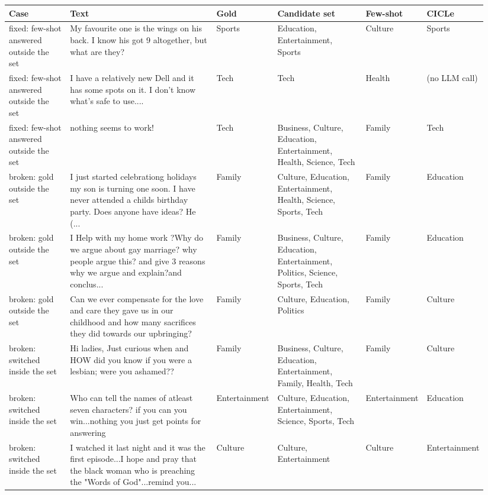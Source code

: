 \begin{tabular}{p{0.14\linewidth}p{0.36\linewidth}p{0.08\linewidth}p{0.2\linewidth}p{0.08\linewidth}p{0.08\linewidth}}
\toprule
Case & Text & Gold & Candidate set & Few-shot & CICLe \\
\midrule
fixed: few-shot answered outside the set & My favourite one is the wings on his back. I know his got 9 altogether, but what are they? & Sports & Education, Entertainment, Sports & Culture & Sports \\
fixed: few-shot answered outside the set & I have a relatively new Dell and it has some spots on it. I don't know what's safe to use.... & Tech & Tech & Health & (no LLM call) \\
fixed: few-shot answered outside the set & nothing seems to work! & Tech & Business, Culture, Education, Entertainment, Health, Science, Tech & Family & Tech \\
broken: gold outside the set & I just started celebrationg holidays my son is turning one soon. I have never attended a childs birthday party. Does anyone have ideas? He (... & Family & Culture, Education, Entertainment, Health, Science, Sports, Tech & Family & Education \\
broken: gold outside the set & I Help with my home work ?Why do we argue about gay marriage? why people argue this? and give 3 reasons why we argue and explain?and conclus... & Family & Business, Culture, Education, Entertainment, Politics, Science, Sports, Tech & Family & Education \\
broken: gold outside the set & Can we ever compensate for the love and care they gave us in our childhood and how many sacrifices they did towards our upbringing? & Family & Culture, Education, Politics & Family & Culture \\
broken: switched inside the set & Hi ladies, Just curious when and HOW did you know if you were a lesbian; were you ashamed?? & Family & Business, Culture, Education, Entertainment, Family, Health, Tech & Family & Culture \\
broken: switched inside the set & Who can tell the names of atleast seven characters? if you can you win...nothing you just get points for answering & Entertainment & Culture, Education, Entertainment, Science, Sports, Tech & Entertainment & Education \\
broken: switched inside the set & I watched it last night and it was the first episode...I hope and pray that the black woman who is preaching the "Words of God"...remind you... & Culture & Culture, Entertainment & Culture & Entertainment \\

\end{tabular}
